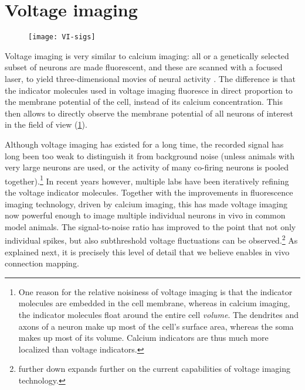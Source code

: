 \FloatBarrier
\section{Voltage imaging}

\begin{figure}
    \texttt{[image: VI-sigs]}
    \label{fig:VI-sigs}
\end{figure}

Voltage imaging is very similar to calcium imaging: all or a genetically selected subset of neurons are made fluorescent, and these are scanned with a focused laser, to yield three-dimensional movies of neural activity \cite{Knopfel2019OpticalVoltageImaging}.
The difference is that the indicator molecules used in voltage imaging fluoresce in direct proportion to the membrane potential of the cell, instead of its calcium concentration. This then allows to directly observe the membrane potential of all neurons of interest in the field of view (\cref{fig:VI-sigs}).

Although voltage imaging has existed for a long time, the recorded signal has long been too weak to distinguish it from background noise (unless animals with very large neurons are used, or the activity of many co-firing neurons is pooled together).\footnote{
    One reason for the relative noisiness of voltage imaging is that the indicator molecules are embedded in the cell membrane, whereas in calcium imaging, the indicator molecules float around the entire cell \emph{volume}. The dendrites and axons of a neuron make up most of the cell's surface area, whereas the soma makes up most of its volume. Calcium indicators are thus much more localized than voltage indicators.
}
In recent years however, multiple labs have been iteratively refining the voltage indicator molecules. Together with the improvements in fluorescence imaging technology, driven by calcium imaging, this has made voltage imaging now powerful enough to image multiple individual neurons in vivo in common model animals. The signal-to-noise ratio has improved to the point that not only individual spikes, but also subthreshold voltage fluctuations can be observed.\footnote{
     further down expands further on the current capabilities of voltage imaging technology.
}
As explained next, it is precisely this level of detail that we believe enables in vivo connection mapping.


